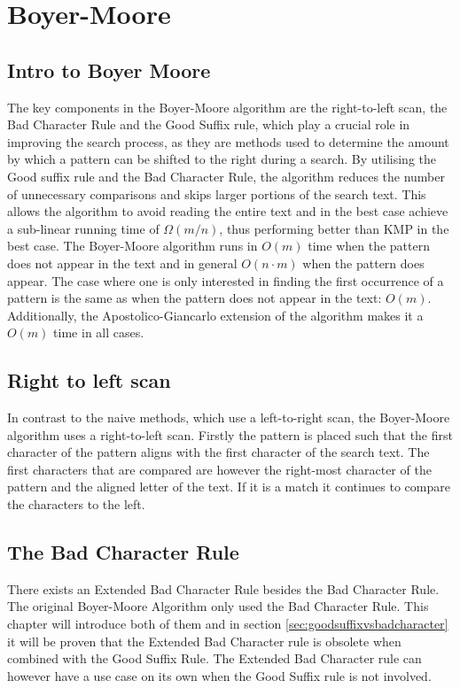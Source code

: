 
\section{Boyer-Moore}

\subsection{Intro to Boyer Moore}
The key components in the Boyer-Moore algorithm are the right-to-left scan, the Bad Character Rule and the Good Suffix rule, which play a crucial role in improving the search process, as they are methods used to determine the amount by which a pattern can be shifted to the right during a search. By utilising the Good suffix rule and the Bad Character Rule, the algorithm reduces the number of unnecessary comparisons and skips larger portions of the search text. This allows the algorithm to avoid reading the entire text and in the best case achieve a sub-linear running time of $\Omega(m/n)$, thus performing better than KMP in the best case. The Boyer-Moore algorithm runs in $O(m)$ time when the pattern does not appear in the text and in general $O(n\cdot m)$ when the pattern does appear. The case where one is only interested in finding the first occurrence of a pattern is the same as when the pattern does not appear in the text: $O(m)$. Additionally, the Apostolico-Giancarlo extension of the algorithm makes it a $O(m)$ time in all cases. 

\subsection{Right to left scan}
In contrast to the naive methods, which use a left-to-right scan, the Boyer-Moore algorithm uses a right-to-left scan. Firstly the pattern is placed such that the first character of the pattern aligns with the first character of the search text. The first characters that are compared are however the right-most character of the pattern and the aligned letter of the text.  If it is a match it continues to compare the characters to the left.

\subsection{The Bad Character Rule}
There exists an Extended Bad Character Rule besides the Bad Character Rule. The original Boyer-Moore Algorithm only used the Bad Character Rule. This chapter will introduce both of them and in section \ref{sec:goodsuffixvsbadcharacter} it will be proven that the Extended Bad Character rule is obsolete when combined with the Good Suffix Rule. The Extended Bad Character rule can however have a use case on its own when the Good Suffix rule is not involved. 

